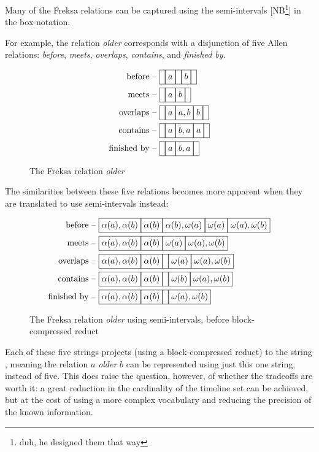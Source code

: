 \documentclass[a4paper,12pt,leqno]{article}
\newcommand{\vph}[1]{\vphantom{#1}}
\newcommand{\ebox}[1]{\fbox{$\vph{'(),}#1$}}
\newcommand{\nbBefore}[2]{\ebox{#1}\ebox{}\ebox{#2}}
\newcommand{\nbMeets}[2]{\ebox{#1}\ebox{#2}}
\newcommand{\nbOverlaps}[2]{\ebox{#1}\ebox{#1,#2}\ebox{#2}}
\newcommand{\nbDuring}[2]{\ebox{#2}\ebox{#1,#2}\ebox{#2}}
\newcommand{\nbFinishes}[2]{\ebox{#2}\ebox{#1,#2}}
\newcommand{\nbiDuring}[2]{\nbDuring{#2}{#1}}
\newcommand{\nbiFinishes}[2]{\nbFinishes{#2}{#1}}
\newcommand{\Before}[2]{\ebox{}\nbBefore{#1}{#2}\ebox{}}
\newcommand{\Meets}[2]{\ebox{}\nbMeets{#1}{#2}\ebox{}}
\newcommand{\Overlaps}[2]{\ebox{}\nbOverlaps{#1}{#2}\ebox{}}
\newcommand{\iDuring}[2]{\ebox{}\nbiDuring{#1}{#2}\ebox{}}
\newcommand{\iFinishes}[2]{\ebox{}\nbiFinishes{#1}{#2}\ebox{}}
\newcommand{\siBefore}[2]{\ebox{\alpha(#1),\alpha(#2)}\ebox{\alpha(#2)}\ebox{\alpha(#2),\omega(#1)}\ebox{\omega(#1)}\ebox{\omega(#1),\omega(#2)}}
\newcommand{\siMeets}[2]{\ebox{\alpha(#1),\alpha(#2)}\ebox{\alpha(#2)}\ebox{\omega(#1)}\ebox{\omega(#1),\omega(#2)}}
\newcommand{\siOverlaps}[2]{\ebox{\alpha(#1),\alpha(#2)}\ebox{\alpha(#2)}\ebox{}\ebox{\omega(#1)}\ebox{\omega(#1),\omega(#2)}}
\newcommand{\siiDuring}[2]{\ebox{\alpha(#1),\alpha(#2)}\ebox{\alpha(#2)}\ebox{}\ebox{\omega(#2)}\ebox{\omega(#1),\omega(#2)}}
\newcommand{\siiFinishes}[2]{\ebox{\alpha(#1),\alpha(#2)}\ebox{\alpha(#2)}\ebox{}\ebox{\omega(#1),\omega(#2)}}
\newcommand{\EventString}[1]{
	\renewcommand*{\do}[1]{\ebox{##1}}%
	\PipeParser{#1}
}
\newcommand{\selfnote}[1]{{\color{red}[NB\footnote{{\color{red}#1}}]}}
\newcommand{\nb}{\selfnote}
\begin{document}
Many of the Freksa relations can be captured using the semi-intervals \nb{duh, he designed them that way} in the box-notation.

For example, the relation \textit{older} corresponds with a disjunction of five Allen relations: \textit{before}, \textit{meets}, \textit{overlaps}, \textit{contains}, and \textit{finished by}.
\begin{figure}[h]
	\begin{align*}
	\text{before -- }&\Before{a}{b}\\
	\text{meets -- }&\Meets{a}{b}\\
	\text{overlaps -- }&\Overlaps{a}{b}\\
	\text{contains -- }&\iDuring{a}{b}\\
	\text{finished by -- }&\iFinishes{a}{b}
	\end{align*}
	\caption{The Freksa relation \textit{older}}
\end{figure}
The similarities between these five relations becomes more apparent when they are translated to use semi-intervals instead:
\begin{figure}[h]
	\begin{align*}
	\text{before -- }&\siBefore{a}{b}\\
	\text{meets -- }&\siMeets{a}{b}\\
	\text{overlaps -- }&\siOverlaps{a}{b}\\
	\text{contains -- }&\siiDuring{a}{b}\\
	\text{finished by -- }&\siiFinishes{a}{b}
	\end{align*}
	\caption{The Freksa relation \textit{older} using semi-intervals, before block-compressed reduct}
\end{figure}

Each of these five strings projects (using a block-compressed reduct) to the string \EventString{\alpha(a),\alpha(b)|\alpha(b)|{}}, meaning the relation $a$ \textit{older} $b$ can be represented using just this one string, instead of five. This does raise the question, however, of whether the tradeoffs are worth it: a great reduction in the cardinality of the timeline set can be achieved, but at the cost of using a more complex vocabulary and reducing the precision of the known information.
\end{document}
